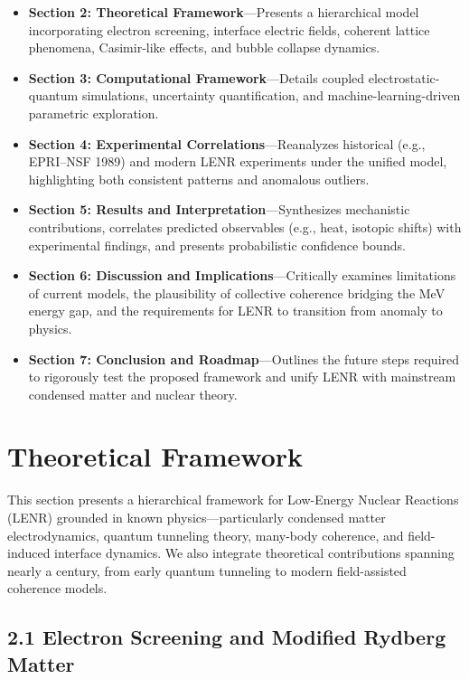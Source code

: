     \begin{itemize}
        \item \textbf{Section 2: Theoretical Framework}—Presents a hierarchical model incorporating electron screening, interface electric fields, coherent lattice phenomena, Casimir-like effects, and bubble collapse dynamics.
        \item \textbf{Section 3: Computational Framework}—Details coupled electrostatic-quantum simulations, uncertainty quantification, and machine-learning-driven parametric exploration.
        \item \textbf{Section 4: Experimental Correlations}—Reanalyzes historical (e.g., EPRI–NSF 1989) and modern LENR experiments under the unified model, highlighting both consistent patterns and anomalous outliers.
        \item \textbf{Section 5: Results and Interpretation}—Synthesizes mechanistic contributions, correlates predicted observables (e.g., heat, isotopic shifts) with experimental findings, and presents probabilistic confidence bounds.
        \item \textbf{Section 6: Discussion and Implications}—Critically examines limitations of current models, the plausibility of collective coherence bridging the MeV energy gap, and the requirements for LENR to transition from anomaly to physics.
        \item \textbf{Section 7: Conclusion and Roadmap}—Outlines the future steps required to rigorously test the proposed framework and unify LENR with mainstream condensed matter and nuclear theory.
    \end{itemize}
    
    \section{Theoretical Framework}
    
    This section presents a hierarchical framework for Low-Energy Nuclear Reactions (LENR) grounded in known physics—particularly condensed matter electrodynamics, quantum tunneling theory, many-body coherence, and field-induced interface dynamics. We also integrate theoretical contributions spanning nearly a century, from early quantum tunneling to modern field-assisted coherence models.
    
    \subsection{2.1 Electron Screening and Modified Rydberg Matter}
    
